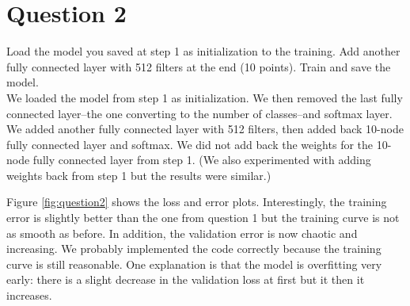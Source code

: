 \documentclass[paper=a4, fontsize=11pt]{scrartcl}
\begin{document}
\section{Question 2}

{\small Load the model you saved at step 1 as initialization to the training. Add another fully connected layer with 512 filters at the end (10 points). Train and save the model.}\\

We loaded the model from step 1 as initialization.  We then removed the last fully connected layer--the one converting to the number of classes--and softmax layer.  We added another fully connected layer with 512 filters, then added back 10-node fully connected layer and softmax.  We did not add back the weights for the 10-node fully connected layer from step 1.  (We also experimented with adding weights back from step 1 but the results were similar.)

Figure \ref{fig:question2} shows the loss and error plots.  Interestingly, the training error is slightly better than the one from question 1 but the training curve is not as smooth as before.  In addition, the validation error is now chaotic and increasing.  We probably implemented the code correctly because the training curve is still reasonable.  One explanation is that the model is overfitting very early: there is a slight decrease in the validation loss at first but it then it increases.
\end{document}
